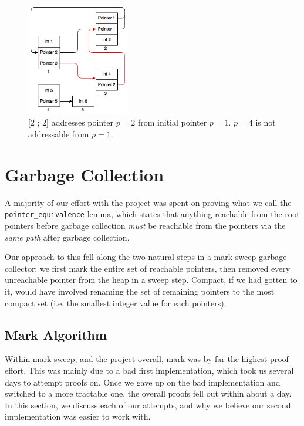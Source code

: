 \documentclass{article}
\begin{document}
\begin{figure}
    \centering
    \includegraphics[width=0.4\textwidth]{images/heapAddresses}
    \caption{[2 ; 2] addresses pointer $p=2$ from initial pointer $p=1$. $p=4$ is not addressable from $p=1$.}
    \label{fig:address}
\end{figure}

\section{Garbage Collection}

A majority of our effort with the project was spent on proving what we call the \lstinline|pointer_equivalence| lemma, which states that anything reachable from the root pointers before garbage collection \emph{must} be reachable from the pointers via the \emph{same path} after garbage collection.

Our approach to this fell along the two natural steps in a mark-sweep garbage collector: we first mark the entire set of reachable pointers, then removed every unreachable pointer from the heap in a sweep step. Compact, if we had gotten to it, would have involved renaming the set of remaining pointers to the most compact set (i.e. the smallest integer value for each pointers).

\subsection{Mark Algorithm}
Within mark-sweep, and the project overall, mark was by far the highest proof effort. This was mainly due to a bad first implementation, which took us several days to attempt proofs on. Once we gave up on the bad implementation and switched to a more tractable one, the overall proofs fell out within about a day. In this section, we discuss each of our attempts, and why we believe our second implementation was easier to work with.
\end{document}
